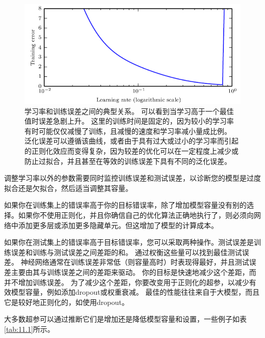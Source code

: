 \begin{figure}[htbp] %
   \centering
   \includegraphics[width=6in]{fig/chap11/11_1.png} 
   \caption{学习率和训练误差之间的典型关系。 可以看到当学习高于一个最佳值时误差急剧上升。 这里的训练时间是固定的，因为较小的学习率有时可能仅仅减慢了训练，且减慢的速度和学习率减小量成比例。 泛化误差可以遵循该曲线，或者由于具有过大或过小的学习率而引起的正则化效应而变得复杂，因为较差的优化可以在一定程度上减少或防止过拟合，并且甚至在等效的训练误差下具有不同的泛化误差。}
   \label{fig:11_1}
\end{figure}

调整学习率以外的参数需要同时监控训练误差和测试误差，以诊断您的模型是过度拟合还是欠拟合，然后适当调整其容量。

如果你在训练集上的错误率高于你的目标错误率，除了增加模型容量没有别的选择。如果你不使用正则化，并且你确信自己的优化算法正确地执行了，则必须向网络中添加更多层或添加更多隐藏单元。但这增加了模型的计算成本。

如果你在测试集上的错误率高于目标错误率，您可以采取两种操作。测试误差是训练误差和训练与测试误差之间差距的和。 通过权衡这些量可以找到最佳测试误差。 神经网络通常在训练误差非常低（则容量高时）时表现得最好，并且测试误差主要由其与训练误差之间的差距来驱动。 你的目标是快速地减少这个差距，而并不增加训练误差。 为了减少这个差距，你要改变用于正则化的超参，以减少有效模型容量，例如添加dropout或权重衰减。 最佳的性能往往来自于大模型，而且它是较好地正则化的，如使用dropout。

大多数超参可以通过推断它们是增加还是降低模型容量和设置，一些例子如表\ref{tab:11.1}所示。

